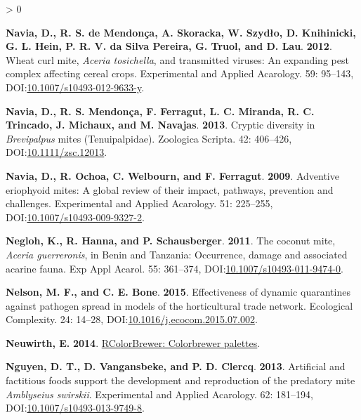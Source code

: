 \documentclass{ufdissertation}[overrideChapters] %
\newlength{\cslhangindent}
\newenvironment{CSLReferences}[2] %
 {%
  \setlength{\parindent}{0pt}
  \ifodd #1 \everypar{\setlength{\hangindent}{\cslhangindent}}\ignorespaces\fi
  \ifnum #2 > 0
  \setlength{\parskip}{#2\baselineskip}
  \fi
 }%
 {}
\begin{document}
{\begin{CSLReferences}{1}{1}
\leavevmode{}%
\textbf{Navia, D., R. S. de Mendonça, A. Skoracka, W. Szydło, D. Knihinicki, G. L. Hein, P. R. V. da Silva Pereira, G. Truol, and D. Lau}. \textbf{2012}. {Wheat curl mite}, {\emph{Aceria tosichella}}, and transmitted viruses: An expanding pest complex affecting cereal crops. Experimental and Applied Acarology. 59: 95--143, DOI:\href{https://doi.org/10.1007/s10493-012-9633-y}{10.1007/s10493-012-9633-y}.

\leavevmode{}%
\textbf{Navia, D., R. S. Mendonça, F. Ferragut, L. C. Miranda, R. C. Trincado, J. Michaux, and M. Navajas}. \textbf{2013}. Cryptic diversity in {\emph{Brevipalpus}} mites ({Tenuipalpidae}). Zoologica Scripta. 42: 406--426, DOI:\href{https://doi.org/10.1111/zsc.12013}{10.1111/zsc.12013}.

\leavevmode{}%
\textbf{Navia, D., R. Ochoa, C. Welbourn, and F. Ferragut}. \textbf{2009}. Adventive eriophyoid mites: A global review of their impact, pathways, prevention and challenges. Experimental and Applied Acarology. 51: 225--255, DOI:\href{https://doi.org/10.1007/s10493-009-9327-2}{10.1007/s10493-009-9327-2}.

\leavevmode{}%
\textbf{Negloh, K., R. Hanna, and P. Schausberger}. \textbf{2011}. The coconut mite, {\emph{Aceria guerreronis}}, in {Benin} and {Tanzania}: Occurrence, damage and associated acarine fauna. Exp Appl Acarol. 55: 361--374, DOI:\href{https://doi.org/10.1007/s10493-011-9474-0}{10.1007/s10493-011-9474-0}.

\leavevmode{}%
\textbf{Nelson, M. F., and C. E. Bone}. \textbf{2015}. Effectiveness of dynamic quarantines against pathogen spread in models of the horticultural trade network. Ecological Complexity. 24: 14--28, DOI:\href{https://doi.org/10.1016/j.ecocom.2015.07.002}{10.1016/j.ecocom.2015.07.002}.

\leavevmode{}%
\textbf{Neuwirth, E.} \textbf{2014}. \href{https://CRAN.R-project.org/package=RColorBrewer}{{RColorBrewer}: Colorbrewer palettes}.

\leavevmode{}%
\textbf{Nguyen, D. T., D. Vangansbeke, and P. D. Clercq}. \textbf{2013}. Artificial and factitious foods support the development and reproduction of the predatory mite {\emph{Amblyseius swirskii}}. Experimental and Applied Acarology. 62: 181--194, DOI:\href{https://doi.org/10.1007/s10493-013-9749-8}{10.1007/s10493-013-9749-8}.


\end{CSLReferences}}
\end{document}
